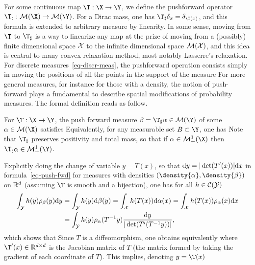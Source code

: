   
For some continuous map $\T : \X \rightarrow \Y$, we define the pushforward operator $\T_\sharp : \Mm(\X) \rightarrow \Mm(\Y)$. 
%
For a Dirac mass, one has $\T_\sharp \de_{x} = \de_{\T(x)}$, and this formula is extended to arbitrary measure by linearity. In some sense, moving from $\T$ to $\T_\sharp$ is a way to linearize any map at the prize of moving from a (possibly) finite dimensional space $\mathcal{X}$ to the infinite dimensional space $\mathcal{M}(\mathcal{X})$, and this idea is central to many convex relaxation method, most notably Lasserre's relaxation.
%
For discrete measures~\eqref{eq-discr-meas}, the pushforward operation consists simply in moving the positions of all the points in the support of the measure
For more general measures, for instance for those with a density, the notion of push-forward plays a fundamental to describe spatial modifications of probability measures. The formal definition reads as follow.

\begin{defn}\label{defn-pushfwd}
For $\T : \X \rightarrow \Y$, the push forward measure $\be = \T_\sharp \al \in \Mm(\Y)$ of some $\al \in \Mm(\X)$ satisfies
Equivalently, for any measurable set $B \subset \Y$, one has
Note that $\T_\sharp$ preserves positivity and total mass, so that if $\al \in \Mm_+^1(\X)$ then $\T_\sharp \al \in \Mm_+^1(\Y)$. 
\end{defn}



\begin{rem}
Explicitly doing the change of variable $y=T(x)$, so that $\mathrm{d} y = |\det(T'(x))| \mathrm{d} x$ in formula~\eqref{eq-push-fwd} for measures with densities $(\density{\al},\density{\be})$ on $\mathbb{R}^d$ (assuming $\T$ is smooth and a bijection), one has for all $h \in \mathcal{C}(\mathcal{Y})$
\begin{align*}
	\int_{\mathcal{Y}} h(y)\rho_\beta(y) \mathrm{d} y &= \int_{\mathcal{Y}} h(y) \mathrm{d} \beta(y) = \int_{\mathcal{X}} h(T(x)) \mathrm{d} \alpha(x) = \int_{\mathcal{X}} h(T(x)) \rho_\alpha(x) \mathrm{d} x \\
		&= \int_{\mathcal{Y}} h(y) \rho_\alpha(T^{-1}y) \frac{\mathrm{d} y}{|\det(T'( T^{-1} y))|}, 
\end{align*}
which shows that 
Since $T$ is a diffeomorphism, one obtains equivalently
where $\T'(x) \in \RR^{\dims \times \dims}$ is the Jacobian matrix of $T$ (the matrix formed by taking the gradient of each coordinate of $T$).
%
This implies, denoting $y=\T(x)$
\end{rem}



